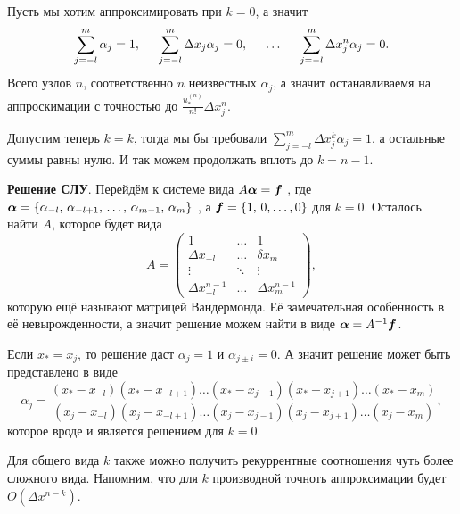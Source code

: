 Пусть мы хотим аппроксимировать при $k=0$, а значит 
\begin{equation*}
    \sum_{j=-l}^{m} \alpha_j = 1, 
    \hspace{5 mm} 
    \sum_{j=-l}^{m} \Delta x_j \alpha_j = 0, 
    \hspace{5 mm} 
    \ldots
    \hspace{5 mm} 
    \sum_{j=-l}^{m} \Delta x_j^n \alpha_j = 0.
\end{equation*}
Всего узлов $n$, соответственно $n$ неизвестных $\alpha_j$, а значит останавливаемя на аппроскимации с точностью до $\frac{u_*^{(n)}}{n!}\Delta x_j^n$. 

Допустим теперь $k=k$, тогда мы бы требовали $\sum_{j=-l}^{m} \Delta x_j^{k} \alpha_j = 1$, а остальные суммы равны нулю. И так можем продолжать вплоть до $k = n-1$. 

\textbf{Решение СЛУ}. Перейдём к системе вида 
$A \mbox{\boldmath $\alpha$} = \mbox{\boldmath $f$}$
, где 
$\mbox{\boldmath $\alpha$} = \{\alpha_{-l},\, \alpha_{-l+1},\, \ldots,\, \alpha_{m-1},\, \alpha_{m}\}$
, а $\mbox{\boldmath $f$} = \{1,\, 0,\ldots,0\}$ для $k=0$. Осталось найти $A$, которое будет вида
\begin{equation*}
    A = \begin{pmatrix}
        1 & \ldots & 1 \\
        \Delta x_{-l} & \ldots & \delta x_{m} \\
        \vdots & \ddots & \vdots \\
        \Delta x_{-l}^{n-1} & \ldots &\Delta x_{m}^{n-1}
    \end{pmatrix},
\end{equation*}
которую ещё называют матрицей Вандермонда. Её замечательная особенность в её невырожденности, а значит решение можем найти в виде $\mbox{\boldmath $\alpha$} = A^{-1} \mbox{\boldmath $f$}$.

Если $x_* = x_j$, то решение даст $\alpha_j = 1$ и $\alpha_{j\pm i} = 0$. А значит решение может быть представлено в виде
\begin{equation*}
    \alpha_j = \frac{
    (x_* - x_{-l}) (x_* - x_{-l+1}) \ldots (x_{*} - x_{j-1}) (x_* - x_{j+1})\ldots (x_* - x_m)
    }{
    (x_j - x_{-l}) (x_j - x_{-l+1}) \ldots (x_{j} - x_{j-1}) (x_j - x_{j+1})\ldots (x_j - x_m)
    },
\end{equation*}
которое вроде и является решением для $k=0$. 

Для общего вида $k$ также можно получить рекуррентные соотношения чуть более сложного вида. Напомним, что для $k$ производной точноть аппроксимации будет $O(\Delta x^{n-k})$.


